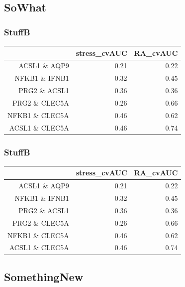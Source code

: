 \documentclass{beamer}
\begin{document}
\subsection{SoWhat}

\begin{frame}[fragile]
  	\frametitle{StuffB}
 		\begin{table}[ht]
  		\centering
  		\begin{tabular}{rrr}
   			\hline
   			& stress\_cvAUC & RA\_cvAUC \\ 
   			\hline
  			ACSL1 \& AQP9 & 0.21 & 0.22 \\ 
  			NFKB1 \& IFNB1 & 0.32 & 0.45 \\ 
  			PRG2 \& ACSL1 & 0.36 & 0.36 \\ 
  			PRG2 \& CLEC5A & 0.26 & 0.66 \\ 
  			NFKB1 \& CLEC5A & 0.46 & 0.62 \\ 
  			ACSL1 \& CLEC5A & 0.46 & 0.74 \\ 
   			\hline
		\end{tabular}
		\end{table}
\end{frame}


\begin{frame}[fragile]
  	\frametitle{StuffB}
 		\begin{table}[ht]
  		\centering
  		\begin{tabular}{rrr}
   			\hline
   			& stress\_cvAUC & RA\_cvAUC \\ 
   			\hline
  			ACSL1 \& AQP9 & 0.21 & 0.22 \\ 
  			NFKB1 \& IFNB1 & 0.32 & 0.45 \\ 
  			PRG2 \& ACSL1 & 0.36 & 0.36 \\ 
  			PRG2 \& CLEC5A & 0.26 & 0.66 \\ 
  			NFKB1 \& CLEC5A & 0.46 & 0.62 \\ 
  			ACSL1 \& CLEC5A & 0.46 & 0.74 \\ 
   			\hline
		\end{tabular}
		\end{table}
\end{frame}

\subsection{SomethingNew}
\end{document}
